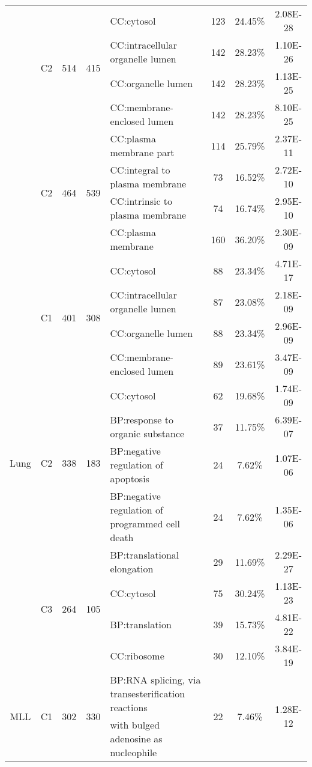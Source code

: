 \begin{table*}[!htb]
\begin{tabular}{c|c|cclccc}
\cline{2-8}
&\multirow{4}{*}{C2}& \multirow{4}{*}{514} &\multirow{4}{*}{415}
&CC:cytosol & 123 & 24.45\% & 2.08E-28\\
&&&&CC:intracellular organelle lumen & 142 & 28.23\% & 1.10E-26\\
&&&&CC:organelle lumen & 142 & 28.23\% & 1.13E-25\\
&&&&CC:membrane-enclosed lumen & 142 & 28.23\% & 8.10E-25\\
\cline{2-8}
&\multirow{4}{*}{C2}& \multirow{4}{*}{464} &\multirow{4}{*}{539}
&CC:plasma membrane part & 114 & 25.79\% & 2.37E-11\\
&&&&CC:integral to plasma membrane & 73 & 16.52\% & 2.72E-10\\
&&&&CC:intrinsic to plasma membrane & 74 & 16.74\% & 2.95E-10\\
&&&&CC:plasma membrane & 160 & 36.20\% & 2.30E-09\\
\hline
\multirow{12}{*}{Lung} &\multirow{4}{*}{C1}& \multirow{4}{*}{401} &\multirow{4}{*}{308}
&CC:cytosol & 88 & 23.34\% & 4.71E-17\\
&&&&CC:intracellular organelle lumen & 87 & 23.08\% & 2.18E-09\\
&&&&CC:organelle lumen & 88 & 23.34\% & 2.96E-09\\
&&&&CC:membrane-enclosed lumen & 89 & 23.61\% & 3.47E-09\\
\cline{2-8}
&\multirow{4}{*}{C2}& \multirow{4}{*}{338} &\multirow{4}{*}{183}
&CC:cytosol & 62 & 19.68\% & 1.74E-09\\
&&&&BP:response to organic substance & 37 & 11.75\% & 6.39E-07\\
&&&&BP:negative regulation of apoptosis & 24 & 7.62\% & 1.07E-06\\
&&&&BP:negative regulation of programmed cell death & 24 & 7.62\% & 1.35E-06\\
\cline{2-8}
&\multirow{4}{*}{C3}& \multirow{4}{*}{264} &\multirow{4}{*}{105}
&BP:translational elongation & 29 & 11.69\% & 2.29E-27\\
&&&&CC:cytosol & 75 & 30.24\% & 1.13E-23\\
&&&&BP:translation & 39 & 15.73\% & 4.81E-22\\
&&&&CC:ribosome & 30 & 12.10\% & 3.84E-19\\
\hline
\multirow{13}{*}{MLL} &\multirow{5}{*}{C1}& \multirow{5}{*}{302} &\multirow{5}{*}{330}
& BP:RNA splicing, via transesterification reactions & \multirow{2}{*}{22} & \multirow{2}{*}{7.46\% }& \multirow{2}{*}{1.28E-12}\\
 &&& & with bulged adenosine as nucleophile &  &  & \\

\end{tabular}
\end{table*}
